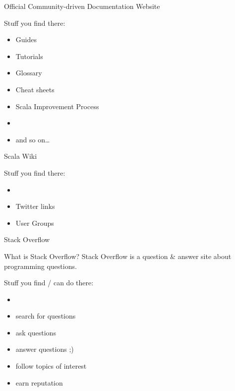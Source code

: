 \begin{frame}{Official Community-driven Documentation Website}
\begin{center}
\end{center}
Stuff you find there:
\begin{itemize}
  \item Guides
  \item Tutorials
  \item Glossary
  \item Cheat sheets
  \item Scala Improvement Process
  \item {}
  \item and so on\ldots
\end{itemize}
\end{frame}

\begin{frame}{Scala Wiki}
\begin{center}
\end{center}
Stuff you find there:
\begin{itemize}
  \item {}
  \item Twitter links
  \item User Groups
\end{itemize}
\end{frame}

\begin{frame}{Stack Overflow}
\begin{center}
\end{center}
\begin{block}{What is Stack Overflow?}
Stack Overflow is a question \& answer site about programming questions.
\end{block}
Stuff you find / can do there:
\begin{itemize}
  \item {}
  \item search for questions
  \item ask questions
  \item answer questions ;)
  \item follow topics of interest
  \item earn reputation
\end{itemize}
\end{frame}


